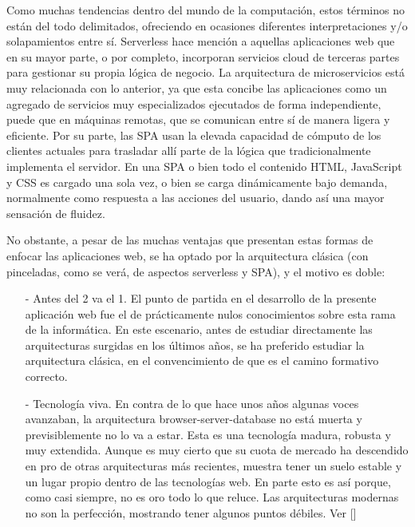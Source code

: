 \documentclass[a4paper]{report}
\begin{document}
    Como muchas tendencias dentro del mundo de la computación, estos términos no están del todo delimitados, ofreciendo en ocasiones diferentes interpretaciones y/o solapamientos entre sí. Serverless hace mención a aquellas aplicaciones web que en su mayor parte, o por completo, incorporan servicios cloud de terceras partes para gestionar su propia lógica de negocio. La arquitectura de microservicios está muy relacionada con lo anterior, ya que esta concibe las aplicaciones como un agregado de servicios muy especializados ejecutados de forma independiente, puede que en máquinas remotas, que se comunican entre sí de manera ligera y eficiente. Por su parte, las SPA usan la elevada capacidad de cómputo de los clientes actuales para trasladar allí parte de la lógica que tradicionalmente implementa el servidor. En una SPA o bien todo el contenido HTML, JavaScript y CSS es cargado una sola vez, o bien se carga dinámicamente bajo demanda, normalmente como respuesta a las acciones del usuario, dando así una mayor sensación de fluidez.
    
    No obstante, a pesar de las muchas ventajas que presentan estas formas de enfocar las aplicaciones web, se ha optado por la arquitectura clásica (con pinceladas, como se verá, de aspectos serverless y SPA), y el motivo es doble:
    
    \begin{itemize}
    	\item[-] Antes del 2 va el 1. El punto de partida en el desarrollo de la presente aplicación web fue el de prácticamente nulos conocimientos sobre esta rama de la informática. En este escenario, antes de estudiar directamente las arquitecturas surgidas en los últimos años, se ha preferido estudiar la arquitectura clásica, en el convencimiento de que es el camino formativo correcto.
    	\item[-] Tecnología viva. En contra de lo que hace unos años algunas voces avanzaban, la arquitectura browser-server-database no está muerta y previsiblemente no lo va a estar. Esta es una tecnología madura, robusta y muy extendida. Aunque es muy cierto que su cuota de mercado ha descendido en pro de otras arquitecturas más recientes, muestra tener un suelo estable y un lugar propio dentro de las tecnologías web. En parte esto es así porque, como casi siempre, no es oro todo lo que reluce. Las arquitecturas modernas no son la perfección, mostrando tener algunos puntos débiles. Ver []
    \end{itemize}
    
\end{document}
